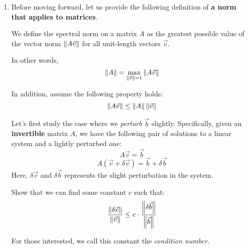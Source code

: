 \begin{enumerate}

    \item Before moving forward, let us provide the following definition of \textbf{a norm that applies to matrices}.

    We define the spectral norm on a matrix $A$ as the greatest possible value of the vector norm $\left\lVert A\vec{v}\right\rVert$ for all unit-length vectors $\vec{v}$.

    In other words,
    $$\left\lVert A\right\rVert = \max _{\left\lVert\vec{v}\right\rVert = 1} \left\lVert A\vec{v}\right\rVert$$

    In addition, assume the following property holds:
    $$\left\lVert A\vec{v}\right\rVert \leq \left\lVert A\right\rVert \left\lVert\vec{v}\right\rVert$$

    Let's first study the case where we \textit{perturb} $\vec{b}$ slightly. Specifically, given an \textbf{invertible} matrix $A$, we have the following pair of solutions to a linear system and a lightly perturbed one:
    $$A\vec{v} = \vec{b}$$
    $$A(\vec{v} + \delta \vec{v}) = \vec{b} + \delta \vec{b}$$
    Here, $\delta \vec{v}$ and $\delta \vec{b}$ represents the slight perturbation in the system. 

    Show that we can find some constant $c$ such that:
    $$
    \frac{\left\lVert\delta \vec{v}\right\rVert}{\left\lVert\vec{v}\right\rVert} \leq c \cdot \frac{\left\lVert\delta \vec{b}\right\rVert}{\left\lVert\vec{b}\right\rVert}
    $$

    For those interested, we call this constant the \textit{condition number}.


\end{enumerate}
